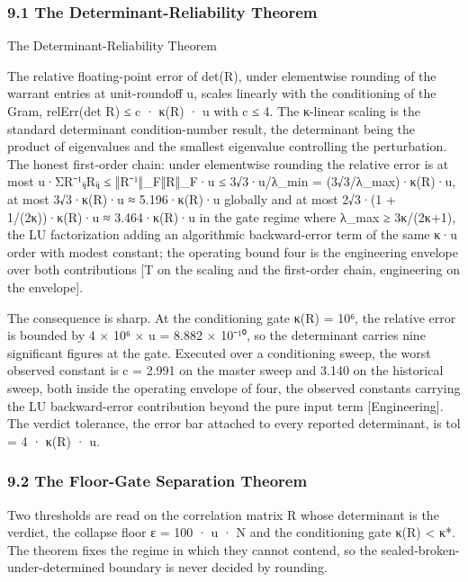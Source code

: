 \documentclass[10pt,twocolumn]{article}
\begin{document}
\hypertarget{the-determinant-reliability-theorem}{%
\subsubsection{9.1 The Determinant-Reliability
Theorem}\label{the-determinant-reliability-theorem}}

\begin{jbox}{The Determinant-Reliability Theorem}

The relative floating-point error of det(R), under elementwise rounding
of the warrant entries at unit-roundoff u, scales linearly with the
conditioning of the Gram, relErr(det R) ≤ c · κ(R) · u with c ≤ 4. The
κ-linear scaling is the standard determinant condition-number result,
the determinant being the product of eigenvalues and the smallest
eigenvalue controlling the perturbation. The honest first-order chain:
under elementwise rounding the relative error is at most
u·Σ\textbar R⁻¹ᵢⱼ\textbar\textbar Rᵢⱼ\textbar{} ≤ ‖R⁻¹‖\_F‖R‖\_F·u ≤
3√3·u/λ\_min = (3√3/λ\_max)·κ(R)·u, at most 3√3·κ(R)·u ≈ 5.196·κ(R)·u
globally and at most 2√3·(1 + 1/(2κ))·κ(R)·u ≈ 3.464·κ(R)·u in the gate
regime where λ\_max ≥ 3κ/(2κ+1), the LU factorization adding an
algorithmic backward-error term of the same κ·u order with modest
constant; the operating bound four is the engineering envelope over both
contributions {[}T on the scaling and the first-order chain, engineering
on the envelope{]}.

\end{jbox}

The consequence is sharp. At the conditioning gate κ(R) = 10⁶, the
relative error is bounded by 4 × 10⁶ × u = 8.882 × 10⁻¹⁰, so the
determinant carries nine significant figures at the gate. Executed over
a conditioning sweep, the worst observed constant is c = 2.991 on the
master sweep and 3.140 on the historical sweep, both inside the
operating envelope of four, the observed constants carrying the LU
backward-error contribution beyond the pure input term
{[}Engineering{]}. The verdict tolerance, the error bar attached to
every reported determinant, is tol = 4 · κ(R) · u.

\hypertarget{the-floor-gate-separation-theorem}{%
\subsubsection{9.2 The Floor-Gate Separation
Theorem}\label{the-floor-gate-separation-theorem}}

Two thresholds are read on the correlation matrix R whose determinant is
the verdict, the collapse floor ε = 100 · u · N and the conditioning
gate κ(R) \textless{} κ*. The theorem fixes the regime in which they
cannot contend, so the sealed-broken-under-determined boundary is never
decided by rounding.
\end{document}
